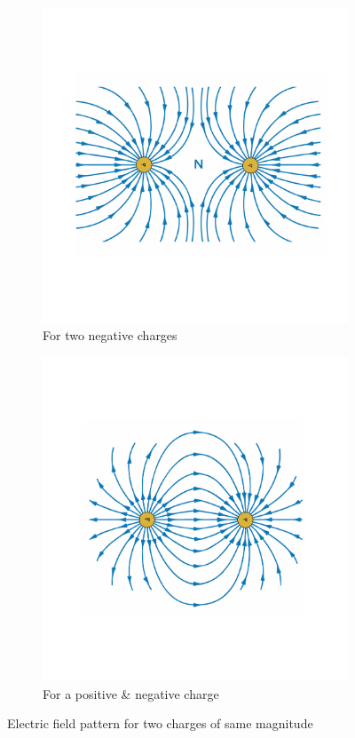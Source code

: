 \begin{figure}[htbp]
  \centering
  \begin{subfigure}[t]{0.3\textwidth}
      \includegraphics[width=\textwidth]{Images/11.6a}
      \caption{For two negative charges}
      \label{fig:11.6(a)}
  \end{subfigure}
  \begin{subfigure}[t]{0.3\textwidth}
      \includegraphics[width=\textwidth]{Images/11.6b}
      \caption{For a positive \& negative charge}
      \label{fig:11.6(b)}
  \end{subfigure}
  \caption[]{Electric field pattern for two charges of same magnitude}
  \label{fig:11.6}
\end{figure}

